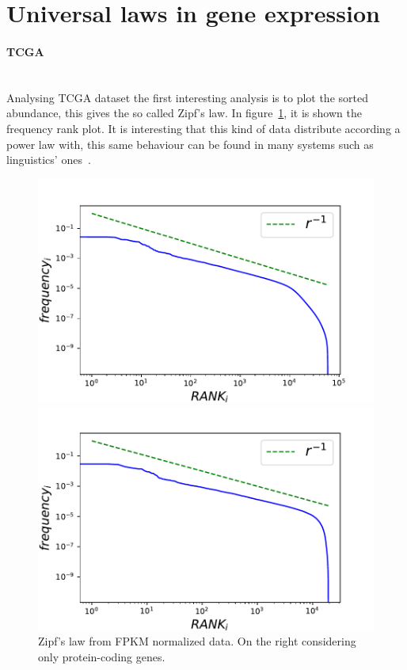 \section{Universal laws in gene expression}\label{sec:universallaws}
\paragraph{TCGA}\mbox{} \\
Analysing TCGA dataset the first interesting analysis is to plot the sorted abundance, this gives the so called Zipf's law.
In figure~\ref{fig:structure/tcga/globalZipf}, it is shown the frequency rank plot. It is interesting that this kind of data distribute according a power law with, this same behaviour can be found in many systems such as linguistics' ones~\cite{altmann2016statistical}.
\begin{figure}[htb!]
	\centering
	\begin{minipage}{0.45\textwidth}
		\includegraphics[width=0.95\linewidth]{pictures/structure/tcga/globalzipf_fpkmall.pdf}
	\end{minipage}
	\hspace{3mm}
	\begin{minipage}{0.45\textwidth}
		\includegraphics[width=0.95\linewidth]{pictures/structure/tcga/globalzipf_fpkm.pdf}
	\end{minipage}
	\caption{Zipf's law from FPKM normalized data. On the right considering only protein-coding genes.}
	\label{fig:structure/tcga/globalZipf}
\end{figure}
